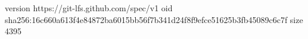 version https://git-lfs.github.com/spec/v1
oid sha256:16c660a613f4e84872ba6015bb56f7b341d24f8f9efce51625b3fb45089c6c7f
size 4395
